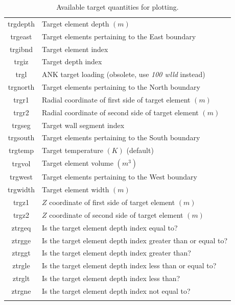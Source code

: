 \documentclass[a4paper,10pt]{report}
\begin{document}
\begin{center}
\begin{longtable}{|c|l|}
    trgdepth \index{b2plot, trgdepth}  & Target element depth $(m)$ \\
    trgeast \index{b2plot, trgeast}   & Target elements pertaining to the East boundary \\
    trgibnd \index{b2plot, trgibnd}     & Target element index \\
    trgiz \index{b2plot, trgiz}     & Target depth index \\
    trgl \index{b2plot, trgl}      & ANK target loading (obsolete, use {\em 100 wlld} instead) \\
    trgnorth \index{b2plot, trgnorth}  & Target elements pertaining to the North boundary \\
    trgr1 \index{b2plot, trgr1}     & Radial coordinate of first side of target element $(m)$ \\
    trgr2 \index{b2plot, trgr2}     & Radial coordinate of second side of target element $(m)$ \\
    trgseg \index{b2plot, trgseg}    & Target wall segment index \\
    trgsouth \index{b2plot, trgsouth}  & Target elements pertaining to the South boundary \\
    trgtemp \index{b2plot, trgtemp}   & Target temperature $(K)$ (default) \\
    trgvol \index{b2plot, trgvol}    & Target element volume $(m^3)$ \\
    trgwest \index{b2plot, trgwest}   & Target elements pertaining to the West boundary \\
    trgwidth \index{b2plot, trgwidth}  & Target element width $(m)$ \\
    trgz1 \index{b2plot, trgz1}     & $Z$ coordinate of first side of target element $(m)$ \\
    trgz2 \index{b2plot, trgz2}     & $Z$ coordinate of second side of target element $(m)$ \\
    ztrgeq \index{b2plot, ztrgeq}    & Is the target element depth index equal to? \\
    ztrgge \index{b2plot, ztrgge}    & Is the target element depth index
    greater than or equal to? \\
    ztrggt \index{b2plot, ztrggt}    & Is the target element depth index greater than? \\
    ztrgle \index{b2plot, ztrgle}    & Is the target element depth index less
    than or equal to? \\
    ztrglt \index{b2plot, ztrglt}    & Is the target element depth index less than? \\
    ztrgne \index{b2plot, ztrgne}    & Is the target element depth index not equal to? \\
    \hline
    \caption{Available target quantities for plotting.}
    \label{tab:targetquantities}
  \end{longtable}
\end{center}
\end{document}
